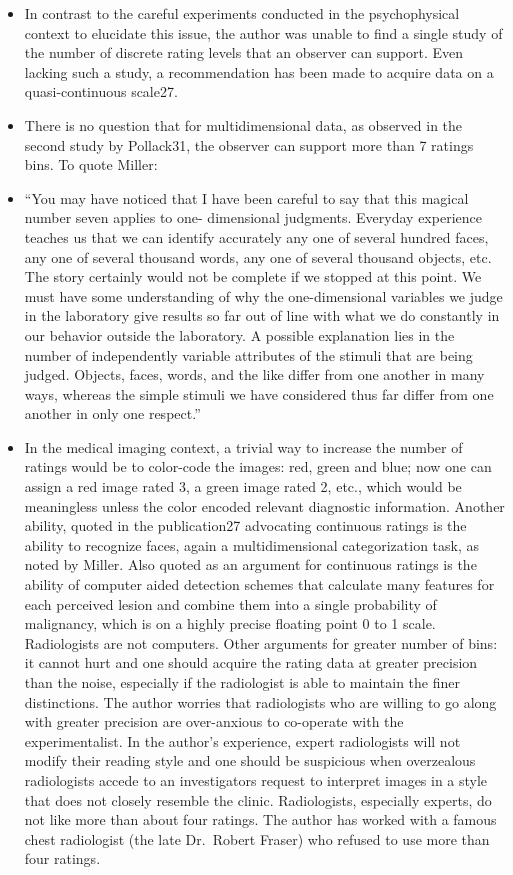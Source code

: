 \documentclass[
]{book}
\begin{document}
\begin{itemize}
\item
  In contrast to the careful experiments conducted in the psychophysical context to elucidate this issue, the author was unable to find a single study of the number of discrete rating levels that an observer can support. Even lacking such a study, a recommendation has been made to acquire data on a quasi-continuous scale27.
\item
  There is no question that for multidimensional data, as observed in the second study by Pollack31, the observer can support more than 7 ratings bins. To quote Miller:
\item
  ``You may have noticed that I have been careful to say that this magical number seven applies to one- dimensional judgments. Everyday experience teaches us that we can identify accurately any one of several hundred faces, any one of several thousand words, any one of several thousand objects, etc. The story certainly would not be complete if we stopped at this point. We must have some understanding of why the one-dimensional variables we judge in the laboratory give results so far out of line with what we do constantly in our behavior outside the laboratory. A possible explanation lies in the number of independently variable attributes of the stimuli that are being judged. Objects, faces, words, and the like differ from one another in many ways, whereas the simple stimuli we have considered thus far differ from one another in only one respect.''
\item
  In the medical imaging context, a trivial way to increase the number of ratings would be to color-code the images: red, green and blue; now one can assign a red image rated 3, a green image rated 2, etc., which would be meaningless unless the color encoded relevant diagnostic information. Another ability, quoted in the publication27 advocating continuous ratings is the ability to recognize faces, again a multidimensional categorization task, as noted by Miller. Also quoted as an argument for continuous ratings is the ability of computer aided detection schemes that calculate many features for each perceived lesion and combine them into a single probability of malignancy, which is on a highly precise floating point 0 to 1 scale. Radiologists are not computers. Other arguments for greater number of bins: it cannot hurt and one should acquire the rating data at greater precision than the noise, especially if the radiologist is able to maintain the finer distinctions. The author worries that radiologists who are willing to go along with greater precision are over-anxious to co-operate with the experimentalist. In the author's experience, expert radiologists will not modify their reading style and one should be suspicious when overzealous radiologists accede to an investigators request to interpret images in a style that does not closely resemble the clinic. Radiologists, especially experts, do not like more than about four ratings. The author has worked with a famous chest radiologist (the late Dr.~Robert Fraser) who refused to use more than four ratings.

\end{itemize}
\end{document}
